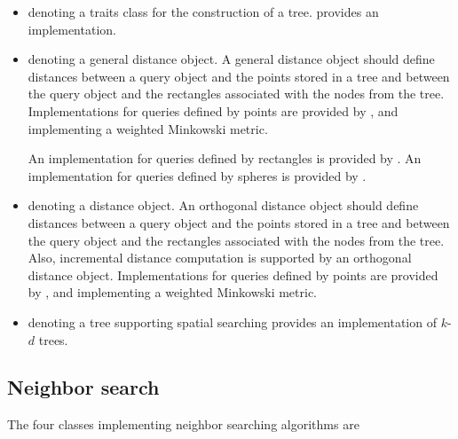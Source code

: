 \begin{itemize}
\item
{} denoting a traits class for the construction of a tree.
 provides an implementation. 

\item
{} denoting a general distance object. A general distance object should define distances between a query object
and the points stored in a tree and between the query object and the rectangles associated with the nodes from the tree.
Implementations for queries defined by points are provided
by , and
 implementing 
a weighted Minkowski metric.

An implementation for queries defined by rectangles is provided by
.
An implementation for queries defined by spheres is provided by
.

\item
{} denoting a distance object. An orthogonal distance object should define distances 
between a query object
and the points stored in a tree and between the query object and the rectangles associated with the nodes from the tree.
Also, incremental distance computation is supported by an orthogonal distance object.
Implementations for queries defined by points are provided
by , and
 implementing 
a weighted Minkowski metric.

\item
{} denoting a tree supporting spatial searching 
 provides an implementation of $k$-$d$ trees.

\end{itemize}

\subsection{Neighbor search}

The four classes implementing neighbor searching algorithms are

